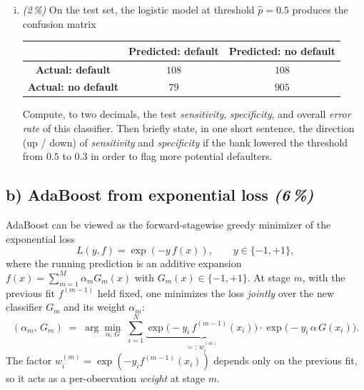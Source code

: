 \documentclass[11pt,a4paper]{article}
\newcommand{\subpoints}[1]{\textit{(#1\,\%)}}
\begin{document}
\begin{enumerate}[(i)]
  \item \subpoints{2} On the test set, the logistic model at threshold $\hat p = 0.5$ produces the confusion matrix

  \begin{center}\small
  \begin{tabular}{c|cc}
   & \textbf{Predicted: default} & \textbf{Predicted: no default} \\ \hline
  \textbf{Actual: default}    & $108$  & $108$ \\
  \textbf{Actual: no default} & $79$  & $905$ \\
  \end{tabular}
  \end{center}

  Compute, to two decimals, the test \emph{sensitivity}, \emph{specificity}, and overall \emph{error rate} of this classifier. Then briefly state, in one short sentence, the direction (up / down) of \emph{sensitivity} and \emph{specificity} if the bank lowered the threshold from $0.5$ to $0.3$ in order to flag more potential defaulters.
\end{enumerate}

\subsection*{b) AdaBoost from exponential loss \subpoints{6}}

AdaBoost can be viewed as the forward-stagewise greedy minimizer of the exponential loss
$$L(y, f) = \exp(-y\, f(x)), \qquad y \in \{-1, +1\},$$
where the running prediction is an additive expansion $f(x) = \sum_{m=1}^{M} \alpha_m G_m(x)$ with $G_m(x) \in \{-1, +1\}$. At stage $m$, with the previous fit $f^{(m-1)}$ held fixed, one minimizes the loss \emph{jointly} over the new classifier $G_m$ and its weight $\alpha_m$:
$$(\alpha_m,\, G_m) \;=\; \arg\min_{\alpha,\,G} \;\sum_{i=1}^{N} \underbrace{\exp\!\bigl(-y_i\, f^{(m-1)}(x_i)\bigr)}_{=:\,w_i^{(m)}} \cdot \exp\!\bigl(-y_i\, \alpha\, G(x_i)\bigr).$$
The factor $w_i^{(m)} = \exp(-y_i f^{(m-1)}(x_i))$ depends only on the previous fit, so it acts as a per-observation \emph{weight} at stage $m$.
\end{document}
